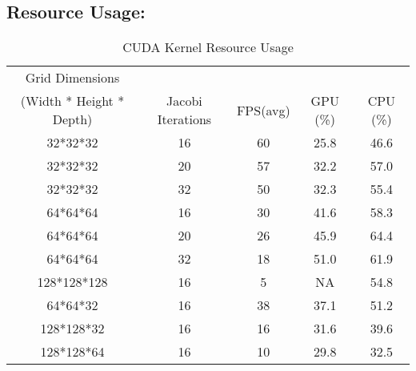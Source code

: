 \subsection{Resource Usage:}
\label{sec:resource}

\begin{table}
\centering
\centering\caption{CUDA Kernel Resource Usage}
\label{tbl:grid}
    \begin{tabular}{c|cccc}
    Grid Dimensions\\(Width * Height * Depth) & Jacobi Iterations & FPS(avg) & GPU (\%) & CPU (\%) \\ \hline\hline
    32*32*32                                  & 16                 & 60         & 25.8                  & 46.6                  \\
    32*32*32                                  & 20                 & 57         & 32.2                  & 57.0                  \\
    32*32*32                                  & 32                 & 50         & 32.3                  & 55.4                  \\
    64*64*64                                  & 16                 & 30         & 41.6                  & 58.3                  \\
    64*64*64                                  & 20                 & 26         & 45.9                  & 64.4                  \\
    64*64*64                                  & 32                 & 18         & 51.0                  & 61.9                  \\
    128*128*128                               & 16                 & 5          & NA                    & 54.8                  \\
    64*64*32                                  & 16                 & 38         & 37.1                  & 51.2                  \\
    128*128*32                                & 16                 & 16         & 31.6                  & 39.6                  \\
    128*128*64                                & 16                 & 10         & 29.8                  & 32.5                  \\
    \end{tabular}
\end{table}


